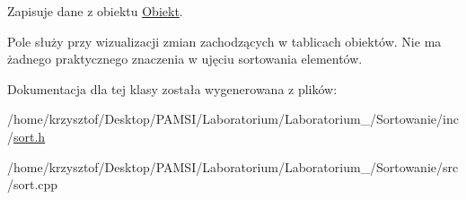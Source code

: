 \-Zapisuje dane z obiektu \hyperlink{class_obiekt}{\-Obiekt}. 

\-Pole służy przy wizualizacji zmian zachodzących w tablicach obiektów. \-Nie ma żadnego praktycznego znaczenia w ujęciu sortowania elementów. 

\-Dokumentacja dla tej klasy została wygenerowana z plików\-:\begin{DoxyCompactItemize}
\item 
/home/krzysztof/\-Desktop/\-P\-A\-M\-S\-I/\-Laboratorium/\-Laboratorium\-\_/\-Sortowanie/inc/\hyperlink{sort_8h}{sort.\-h}\item 
/home/krzysztof/\-Desktop/\-P\-A\-M\-S\-I/\-Laboratorium/\-Laboratorium\-\_/\-Sortowanie/src/sort.\-cpp\end{DoxyCompactItemize}
